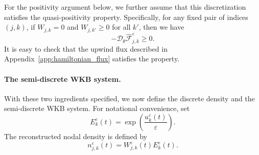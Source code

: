 \documentclass[11pt]{article}
\numberwithin{equation}{section}
\begin{document}
For the positivity argument below, we further assume that this discretization satisfies
the quasi-positivity property. 
Specifically,  for any fixed pair of indices $(j,k)$, if $W_{j,k}=0$ and $W_{j,k'}\ge0$ for all $k'$, then we have 
\begin{equation}\label{ass:H_flux}
-\mathcal D_\theta\widehat{\mathcal F}^{\varepsilon}_{j,k}\ge0 .
\end{equation}
It is easy to check that the upwind flux described in Appendix~\ref{app:hamiltonian_flux} satisfies the property. 





\paragraph{The semi-discrete WKB system.}
With these two ingredients specified, we now define the discrete density and
the semi-discrete WKB system. For notational convenience, set
\begin{equation}\label{def:E}
E_k^\varepsilon(t)
=
\exp\!\left(\frac{u_k^\varepsilon(t)}{\varepsilon}\right).
\end{equation}
The reconstructed nodal density is defined by
\begin{equation}\label{def:n_reconstructed}
n_{j,k}^\varepsilon(t)
=
W_{j,k}^\varepsilon(t)E_k^\varepsilon(t).
\end{equation}
\end{document}
